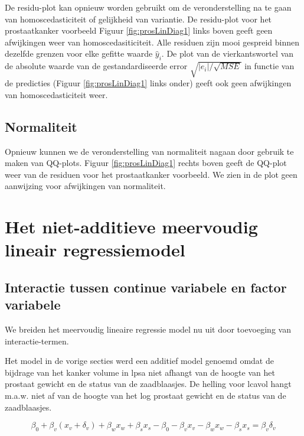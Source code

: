 \documentclass[
  12pt,dutch,coursenotes]{book}
\theoremstyle{definition}
\theoremstyle{definition}
\theoremstyle{definition}
\theoremstyle{definition}
\theoremstyle{remark}
\begin{document}
De residu-plot kan opnieuw worden gebruikt om de veronderstelling na te gaan van homoscedasticiteit of gelijkheid van variantie.
De residu-plot voor het prostaatkanker voorbeeld Figuur \ref{fig:prosLinDiag1} links boven geeft geen afwijkingen weer van homoscedasiticiteit.
Alle residuen zijn mooi gespreid binnen dezelfde grenzen voor elke gefitte waarde \(\hat y_i\).
De plot van de vierkantswortel van de absolute waarde van de gestandardiseerde error \(\sqrt{|e_i|/\sqrt{MSE}}\) in functie van de predicties (Figuur \ref{fig:prosLinDiag1} links onder) geeft ook geen afwijkingen van homoscedasticiteit weer.

\hypertarget{normaliteit}{%
\subsection{Normaliteit}\label{normaliteit}}

Opnieuw kunnen we de veronderstelling van normaliteit nagaan door gebruik te maken van QQ-plots. Figuur \ref{fig:prosLinDiag1} rechts boven geeft de QQ-plot weer van de residuen voor het prostaatkanker voorbeeld. We zien in de plot geen aanwijzing voor afwijkingen van normaliteit.

\hypertarget{het-niet-additieve-meervoudig-lineair-regressiemodel}{%
\section{Het niet-additieve meervoudig lineair regressiemodel}\label{het-niet-additieve-meervoudig-lineair-regressiemodel}}

\hypertarget{interactie-tussen-continue-variabele-en-factor-variabele}{%
\subsection{Interactie tussen continue variabele en factor variabele}\label{interactie-tussen-continue-variabele-en-factor-variabele}}

We breiden het meervoudig lineaire regressie model nu uit door toevoeging van interactie-termen.

Het model in de vorige secties werd een additief model genoemd omdat de bijdrage van het kanker volume in lpsa niet afhangt van de hoogte van het prostaat gewicht en de status van de zaadblaasjes. De helling voor lcavol hangt m.a.w. niet af van de hoogte van het log prostaat gewicht en de status van de zaadblaasjes.

\[
\beta_0 + \beta_v (x_{v}+\delta_v) + \beta_w x_{w} +\beta_s x_{s} - \beta_0 - \beta_v x_{v} - \beta_w x_{w} -\beta_s x_s = \beta_v \delta_v
\]
\end{document}
